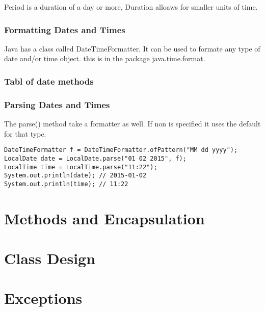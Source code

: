 \documentclass[a4paper]{report}   %
\begin{document}
Period is a duration of a day or more, Duration alloaws for smaller units of time.

\subsection*{Formatting Dates and Times}

Java has a class called DateTimeFormatter. It can be used to formate any type of date and/or time object. this is in the package java.time.format.

\subsection{Tabl of date methods}

\subsection{Parsing Dates and Times}

The parse() method take a formatter as well. If non is specified it uses the default for that type.

\begin{lstlisting}
DateTimeFormatter f = DateTimeFormatter.ofPattern("MM dd yyyy");
LocalDate date = LocalDate.parse("01 02 2015", f);
LocalTime time = LocalTime.parse("11:22");
System.out.println(date); // 2015-01-02
System.out.println(time); // 11:22
\end{lstlisting}

\chapter{Methods and Encapsulation}

\chapter{Class Design}

\chapter{Exceptions}
\end{document}
